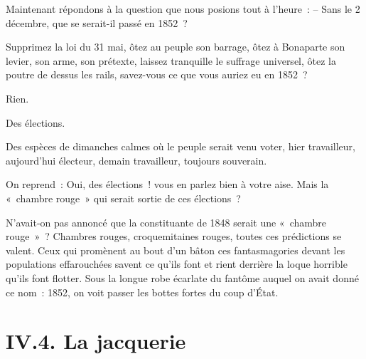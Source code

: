 \documentclass[french,twoside]{book} %
\begin{document}
Maintenant répondons à la question que nous posions tout à l’heure : – Sans le 2 décembre, que se serait-il passé en 1852 ?\par
Supprimez la loi du 31 mai, ôtez au peuple son barrage, ôtez à Bonaparte son levier, son arme, son prétexte, laissez tranquille le suffrage universel, ôtez la poutre de dessus les rails, savez-vous ce que vous auriez eu en 1852 ?\par
Rien.\par
Des élections.\par
Des espèces de dimanches calmes où le peuple serait venu voter, hier travailleur, aujourd’hui électeur, demain travailleur, toujours souverain.\par
On reprend : Oui, des élections ! vous en parlez bien à votre aise. Mais la « chambre rouge » qui serait sortie de ces élections ?\par
N’avait-on pas annoncé que la constituante de 1848 serait une « chambre rouge » ? Chambres rouges, croquemitaines rouges, toutes ces prédictions se valent. Ceux qui promènent au bout d’un bâton ces fantasmagories devant les populations effarouchées savent ce qu’ils font et rient derrière la loque horrible qu’ils font flotter. Sous la longue robe écarlate du fantôme auquel on avait donné ce nom : 1852, on voit passer les bottes fortes du coup d’État.

\section[{IV.4. La jacquerie}]{IV.4. La jacquerie}
\end{document}

